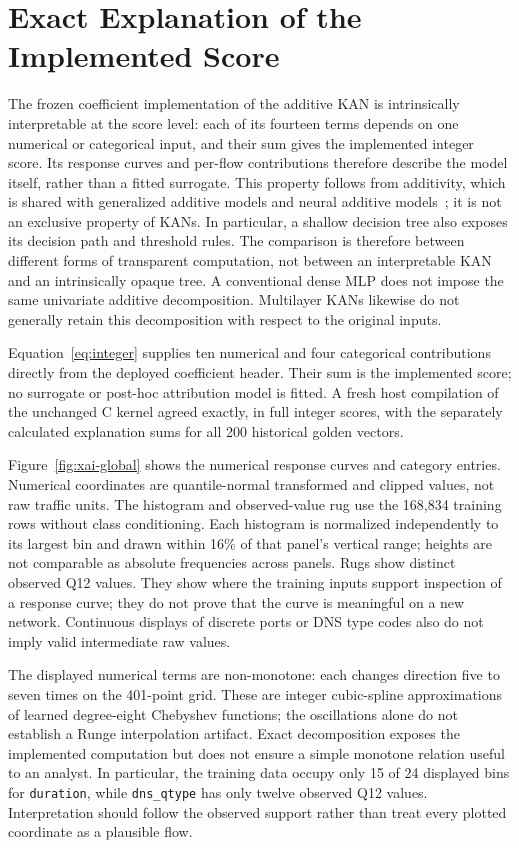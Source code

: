 \documentclass{ieeeaccess}
\begin{document}
\section{Exact Explanation of the Implemented Score}
The frozen coefficient implementation of the additive KAN is intrinsically interpretable at the score level: each of its fourteen terms depends on one numerical or categorical input, and their sum gives the implemented integer score. Its response curves and per-flow contributions therefore describe the model itself, rather than a fitted surrogate. This property follows from additivity, which is shared with generalized additive models and neural additive models~\cite{agarwal2021nam}; it is not an exclusive property of KANs. In particular, a shallow decision tree also exposes its decision path and threshold rules. The comparison is therefore between different forms of transparent computation, not between an interpretable KAN and an intrinsically opaque tree. A conventional dense MLP does not impose the same univariate additive decomposition. Multilayer KANs likewise do not generally retain this decomposition with respect to the original inputs.

Equation~\eqref{eq:integer} supplies ten numerical and four categorical contributions directly from the deployed coefficient header. Their sum is the implemented score; no surrogate or post-hoc attribution model is fitted. A fresh host compilation of the unchanged C kernel agreed exactly, in full integer scores, with the separately calculated explanation sums for all 200 historical golden vectors.

Figure~\ref{fig:xai-global} shows the numerical response curves and category entries. Numerical coordinates are quantile-normal transformed and clipped values, not raw traffic units. The histogram and observed-value rug use the 168,834 training rows without class conditioning. Each histogram is normalized independently to its largest bin and drawn within 16\% of that panel's vertical range; heights are not comparable as absolute frequencies across panels. Rugs show distinct observed Q12 values. They show where the training inputs support inspection of a response curve; they do not prove that the curve is meaningful on a new network. Continuous displays of discrete ports or DNS type codes also do not imply valid intermediate raw values.

The displayed numerical terms are non-monotone: each changes direction five to seven times on the 401-point grid. These are integer cubic-spline approximations of learned degree-eight Chebyshev functions; the oscillations alone do not establish a Runge interpolation artifact. Exact decomposition exposes the implemented computation but does not ensure a simple monotone relation useful to an analyst. In particular, the training data occupy only 15 of 24 displayed bins for \texttt{duration}, while \texttt{dns\_qtype} has only twelve observed Q12 values. Interpretation should follow the observed support rather than treat every plotted coordinate as a plausible flow.
\end{document}
